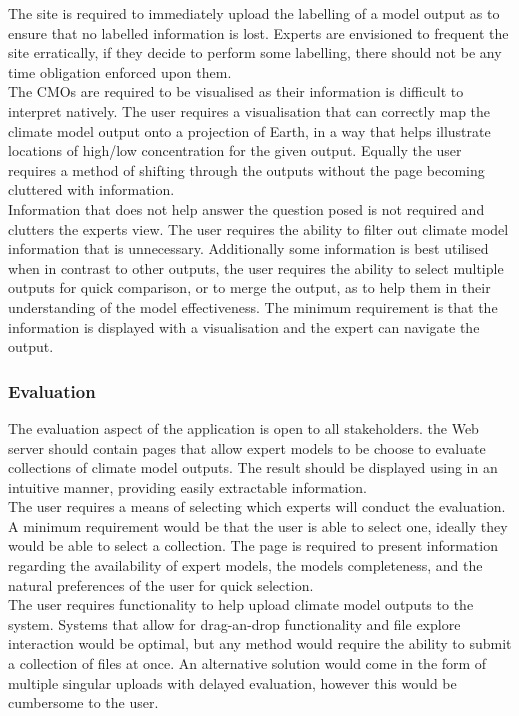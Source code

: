 \documentclass{ecmm427_assignment}
\begin{document}
\noindent The site is required to immediately upload the labelling of a model output as to ensure that no labelled information is lost. Experts are envisioned to frequent the site erratically, if they decide to perform some labelling, there should not be any time obligation enforced upon them.\\

\noindent The CMOs are required to be visualised as their information is difficult to interpret natively. The user requires a visualisation that can correctly map the climate model output onto a projection of Earth, in a way that helps illustrate locations of high/low concentration for the given output. Equally the user requires a method of shifting through the outputs without the page becoming cluttered with information.\\

\noindent Information that does not help answer the question posed is not required and clutters the experts view. The user requires the ability to filter out climate model information that is unnecessary. Additionally some information is best utilised when in contrast to other outputs, the user requires the ability to select multiple outputs for quick comparison, or to merge the output, as to help them in their understanding of the model effectiveness. The minimum requirement is that the information is displayed with a visualisation and the expert can navigate the output. 

\subsubsection{Evaluation}

The evaluation aspect of the application is open to all stakeholders. the Web server should contain pages that allow expert models to be choose to evaluate collections of climate model outputs. The result should be displayed using in an intuitive manner, providing easily extractable information.\\

\noindent The user requires a means of selecting which experts will conduct the evaluation. A minimum requirement would be that the user is able to select one, ideally they would be able to select a collection. The page is required to present information regarding the availability of expert models, the models completeness, and the natural preferences of the user for quick selection.\\

\noindent The user requires functionality to help upload climate model outputs to the system. Systems that allow for drag-an-drop functionality and file explore interaction would be optimal, but any method would require the ability to submit a collection of files at once. An alternative solution would come in the form of multiple singular uploads with delayed evaluation, however this would be cumbersome to the user.\\
\end{document}
